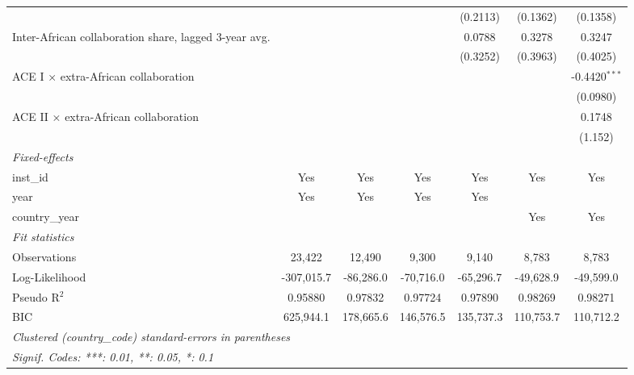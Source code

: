 \begin{tabular}{lcccccc}
                                                         &              &                &                 & (0.2113)        & (0.1362)        & (0.1358)\\   
   Inter-African collaboration share, lagged 3-year avg. &              &                &                 & 0.0788          & 0.3278          & 0.3247\\   
                                                         &              &                &                 & (0.3252)        & (0.3963)        & (0.4025)\\   
   ACE I × extra-African collaboration                   &              &                &                 &                 &                 & -0.4420$^{***}$\\   
                                                         &              &                &                 &                 &                 & (0.0980)\\   
   ACE II × extra-African collaboration                  &              &                &                 &                 &                 & 0.1748\\   
                                                         &              &                &                 &                 &                 & (1.152)\\   
   \midrule
   \emph{Fixed-effects}\\
   inst\_id                                              & Yes          & Yes            & Yes             & Yes             & Yes             & Yes\\  
   year                                                  & Yes          & Yes            & Yes             & Yes             &                 & \\  
   country\_year                                         &              &                &                 &                 & Yes             & Yes\\  
   \midrule
   \emph{Fit statistics}\\
   Observations                                          & 23,422       & 12,490         & 9,300           & 9,140           & 8,783           & 8,783\\  
   Log-Likelihood                                        & -307,015.7   & -86,286.0      & -70,716.0       & -65,296.7       & -49,628.9       & -49,599.0\\  
   Pseudo R$^2$                                          & 0.95880      & 0.97832        & 0.97724         & 0.97890         & 0.98269         & 0.98271\\  
   BIC                                                   & 625,944.1    & 178,665.6      & 146,576.5       & 135,737.3       & 110,753.7       & 110,712.2\\  
   \midrule \midrule
   \multicolumn{7}{l}{\emph{Clustered (country\_code) standard-errors in parentheses}}\\
   \multicolumn{7}{l}{\emph{Signif. Codes: ***: 0.01, **: 0.05, *: 0.1}}\\
\end{tabular}
\par\endgroup



